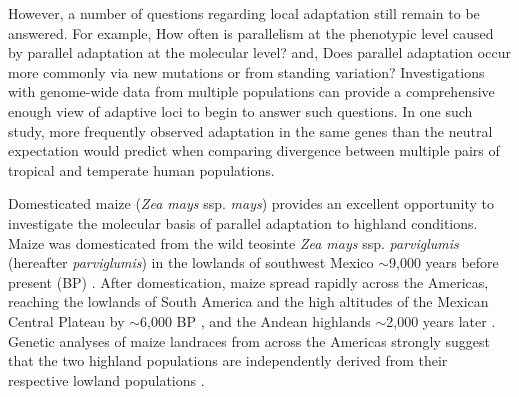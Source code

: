 %
%
However, a number of questions regarding local adaptation still remain to be answered.  For example, How often is parallelism at the phenotypic level caused by parallel adaptation at the molecular level? and, Does parallel adaptation occur more commonly via new mutations or from standing variation?
Investigations with genome-wide data from multiple populations can provide a comprehensive enough view of adaptive loci to begin to answer such questions.
In one such study, \cite{Tennessen_2011_21698142} more frequently observed adaptation in the same genes than the neutral expectation would predict when comparing divergence between multiple pairs of tropical and temperate human populations. 

Domesticated maize (\emph{Zea mays} ssp. \emph{mays}) provides an excellent opportunity to investigate the molecular basis of parallel adaptation to highland conditions.  Maize was domesticated from the wild teosinte \emph{Zea mays} ssp. \emph{parviglumis} (hereafter \emph{parviglumis}) in the lowlands of southwest Mexico $\sim$9,000 years before present (BP) \cite[]{Matsuoka_2002_11983901,Piperno_2009_19307570,vanHeerwaarden_2011_21189301}. After domestication, maize spread rapidly across the Americas, reaching the lowlands of South America and the high altitudes of the Mexican Central Plateau by $\sim$6,000 BP \cite[]{Piperno_2006_69}, and the Andean highlands $\sim$2,000 years later \cite[]{Perry_2006_16511492,Grobman_2012_22307642}. Genetic analyses of maize landraces from across the Americas strongly suggest that the two highland populations are independently derived from their respective lowland populations \cite[]{Vigouroux_2008_21632329, vanHeerwaarden_2011_21189301}. 

